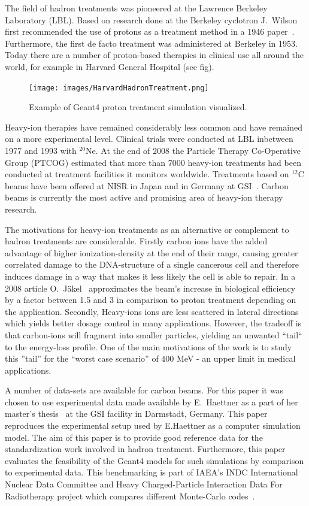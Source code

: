 The field of hadron treatments was pioneered at the Lawrence Berkeley Laboratory (LBL). Based on research done at the Berkeley cyclotron J.~Wilson first recommended the use of protons as a treatment method in a 1946 paper~\cite{RW46}. Furthermore, the first de facto treatment was administered at Berkeley in 1953. Today there are a number of proton-based therapies in clinical use all around the world, for example in Harvard General Hospital (see fig). %
\begin{figure}[h]
\begin{center}
\texttt{[image: images/HarvardHadronTreatment.png]}  
\caption{\label{fig:HarvardHadron} Example of Geant4 proton treatment simulation visualized.} 
\end{center}
\end{figure} 
Heavy-ion therapies have remained considerably less common and have remained on a more experimental level. Clinical trials were conducted at LBL inbetween 1977 and 1993 with $^{20}$Ne. At the end of 2008 the Particle Therapy Co-Operative  Group (PTCOG) estimated that more than 7000 heavy-ion treatments had been conducted at treatment facilities it monitors worldwide. Treatments based on $^{12}$C beams have been offered at NISR in Japan and in Germany at GSI~\cite{PTCOGstat}. Carbon beams is currently the most active and promising area of heavy-ion therapy research. 

The motivations for heavy-ion treatments as an alternative or complement to hadron treatments are considerable. Firstly carbon ions have the added advantage of higher ionization-density at the end of their range, causing greater correlated damage to the DNA-structure of a single cancerous cell and therefore induces damage in a way that makes it less likely the cell is able to repair. In a 2008 article O.~Jäkel~\cite{ojakel} approximates the beam's increase in biological efficiency by a factor between 1.5 and 3 in comparison to proton treatment depending on the application. Secondly, Heavy-ions ions are less scattered in lateral directions which yields better dosage control in many applications. However, the tradeoff is that carbon-ions will fragment into smaller particles, yielding an unwanted ``tail`` to the energy-loss profile. One of the main motivations of the work is to study this ''tail'' for the ``worst case scenario'' of 400 MeV - an upper limit in medical applications.

A number of data-sets are available for carbon beams. For this paper it was chosen to use experimental data made available by E.~Haettner as a part of her master's thesis~\cite{ehaettner} at the GSI facility in Darmstadt, Germany. This paper reproduces the experimental setup used by E.Haettner as a computer simulation model. The aim of this paper is to provide good reference data for the standardization work involved in hadron treatment. Furthermore, this paper evaluates the feasibility of the Geant4 models for such simulations by comparison to experimental data. This benchmarking is part of IAEA's INDC International Nuclear Data Committee and Heavy Charged-Particle Interaction Data For Radiotherapy project which compares different Monte-Carlo codes~\cite{SummaryReport}.

